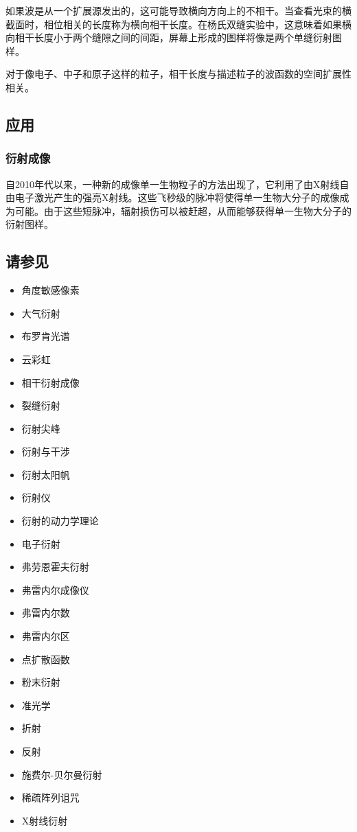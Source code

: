 如果波是从一个扩展源发出的，这可能导致横向方向上的不相干。当查看光束的横截面时，相位相关的长度称为横向相干长度。在杨氏双缝实验中，这意味着如果横向相干长度小于两个缝隙之间的间距，屏幕上形成的图样将像是两个单缝衍射图样。

对于像电子、中子和原子这样的粒子，相干长度与描述粒子的波函数的空间扩展性相关。
\subsection{应用}
\subsubsection{衍射成像}
自2010年代以来，一种新的成像单一生物粒子的方法出现了，它利用了由X射线自由电子激光产生的强亮X射线。这些飞秒级的脉冲将使得单一生物大分子的成像成为可能。由于这些短脉冲，辐射损伤可以被赶超，从而能够获得单一生物大分子的衍射图样。
\subsection{请参见}
\begin{itemize}
\item 角度敏感像素
\item 大气衍射
\item 布罗肯光谱
\item 云彩虹
\item 相干衍射成像
\item 裂缝衍射
\item 衍射尖峰
\item 衍射与干涉
\item 衍射太阳帆
\item 衍射仪
\item 衍射的动力学理论
\item 电子衍射
\item 弗劳恩霍夫衍射
\item 弗雷内尔成像仪
\item 弗雷内尔数
\item 弗雷内尔区
\item 点扩散函数
\item 粉末衍射
\item 准光学
\item 折射
\item 反射
\item 施费尔-贝尔曼衍射
\item 稀疏阵列诅咒
\item X射线衍射
\end{itemize}
